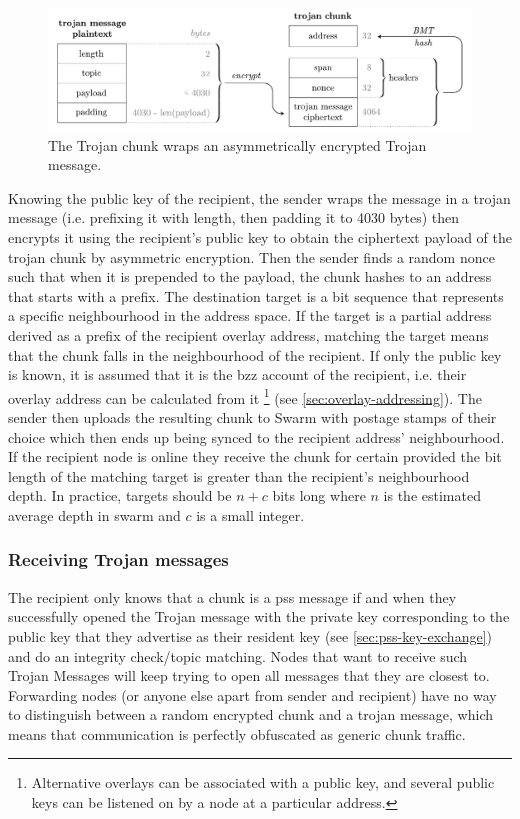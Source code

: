 \begin{figure}[htbp]
\centering
\includegraphics[width=\textwidth]{fig/trojan-chunk-3.pdf}
\caption[Trojan chunk\statusgreen]{The Trojan chunk wraps an asymmetrically encrypted Trojan message.}
\label{fig:trojan-chunk}
\end{figure}

Knowing the public key of the recipient, the sender wraps the message in a trojan message (i.e. prefixing it with length, then padding it to 4030 bytes) then encrypts it using the recipient's public key to obtain the ciphertext payload of the trojan chunk by asymmetric encryption. Then the sender finds a random nonce such that when it is prepended to the payload, the chunk hashes to an address that starts with a  prefix. The destination target is a bit sequence that represents a specific neighbourhood in the address space. If the target is a partial address derived as a prefix of the recipient overlay address, matching the target means that the chunk falls in the neighbourhood of the recipient. If only the public key is known, it is assumed that it is the bzz account of the recipient, i.e. their overlay address can be calculated from it%
%
\footnote{Alternative overlays can be associated with a public key, and several public keys can be listened on by a node at a particular address.}
%
(see \ref{sec:overlay-addressing}). The sender then uploads the resulting chunk to Swarm with postage stamps of their choice which then ends up being synced to the recipient address' neighbourhood. If the recipient node is online they receive the chunk for certain provided the bit length of the matching target is greater than the recipient's neighbourhood depth. In practice, targets should be $n+c$ bits long where $n$ is the estimated average depth in swarm and $c$ is a small integer. 

\subsubsection{Receiving Trojan messages}

The recipient only knows that a chunk is a pss message if and when they successfully opened the Trojan message with the private key corresponding to the public key that they advertise as their resident key (see \ref{sec:pss-key-exchange}) and do an integrity check/topic matching. Nodes that want to receive such Trojan Messages will keep trying to open all messages that they are closest to. Forwarding nodes (or anyone else apart from sender and recipient) have no way to distinguish between a random encrypted chunk and a trojan message, which means that communication is perfectly obfuscated as generic chunk traffic.

